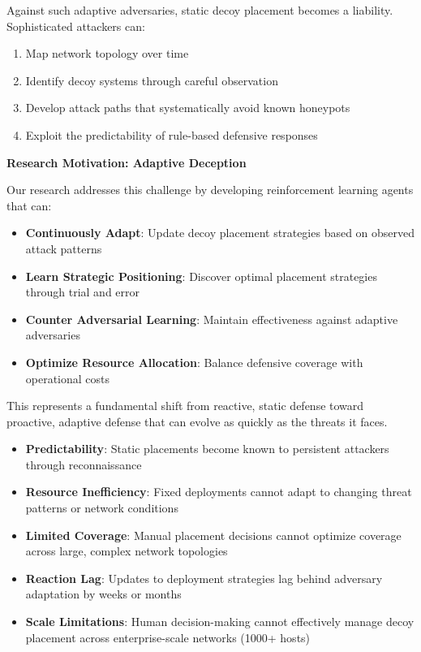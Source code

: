 \documentclass[12pt,oneside]{article}
\begin{document}
Against such adaptive adversaries, static decoy placement becomes a liability. Sophisticated attackers can:
\begin{enumerate}
    \item Map network topology over time
    \item Identify decoy systems through careful observation
    \item Develop attack paths that systematically avoid known honeypots
    \item Exploit the predictability of rule-based defensive responses
\end{enumerate}

\textbf{Research Motivation: Adaptive Deception}

Our research addresses this challenge by developing reinforcement learning agents that can:

\begin{itemize}
    \item \textbf{Continuously Adapt}: Update decoy placement strategies based on observed attack patterns
    \item \textbf{Learn Strategic Positioning}: Discover optimal placement strategies through trial and error
    \item \textbf{Counter Adversarial Learning}: Maintain effectiveness against adaptive adversaries
    \item \textbf{Optimize Resource Allocation}: Balance defensive coverage with operational costs
\end{itemize}

This represents a fundamental shift from reactive, static defense toward proactive, adaptive defense that can evolve as quickly as the threats it faces.
\begin{itemize}
 \item \textbf{Predictability}: Static placements become known to persistent attackers through reconnaissance
    \item \textbf{Resource Inefficiency}: Fixed deployments cannot adapt to changing threat patterns or network conditions
    \item \textbf{Limited Coverage}: Manual placement decisions cannot optimize coverage across large, complex network topologies
    \item \textbf{Reaction Lag}: Updates to deployment strategies lag behind adversary adaptation by weeks or months
    \item \textbf{Scale Limitations}: Human decision-making cannot effectively manage decoy placement across enterprise-scale networks (1000+ hosts)
\end{itemize}
\end{document}
